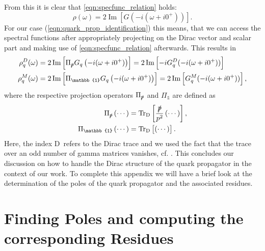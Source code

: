 From this it is clear that \eqref{eqn:specfunc_relation} holds:
\begin{equation}
	\rho(\omega) =  2 \operatorname{Im}\left[G\left(-i(\omega + i0^+)\right)\right].
\end{equation}
For our case (\ref{eqn:quark_prop_identification}) this means, that we can access the spectral functions after appropriately projecting on the Dirac vector and scalar part and making use of \eqref{eqn:specfunc_relation} afterwards.
This results in
\begin{align}
	\rho_q^D(\omega) &= 2 \operatorname{Im}\left[\Pi_{\slashed{p}} G_{q}\left(-i(\omega + i0^+)\right)\right] = 2 \operatorname{Im}\left[-i G_q^D(-i(\omega + i0^+))\right] \\
	\rho_q^M(\omega) &= 2 \operatorname{Im}\left[\Pi_{\mathbb{1}} G_{q}\left(-i(\omega + i0^+)\right)\right]  = 2 \operatorname{Im}\left[G_q^M(-i(\omega + i0^+))\right],
	\label{eqn:correct_relation}
\end{align}
where the respective projection operators $\Pi_{\slashed{p}}$ and $\Pi_{\mathbb{1}}$ are defined as
\begin{align}
	\Pi_{\slashed{p}}\left(\cdots\right) &= \operatorname{Tr}_{\mathrm{D}}\left[\frac{\slashed{p}}{p^2} \left(\cdots\right)\right],\\
	\Pi_{\mathbb{1}}\left(\cdots\right) &= \operatorname{Tr}_{\mathrm{D}}\left[\left(\cdots\right)\right].
\end{align}
Here, the index $\mathrm{D}$\ refers to the Dirac trace and we used the fact that the trace over an odd number of gamma matrices vanishes, cf. \cite{PeskinSchroeder1995}. This concludes our discussion on how to handle the Dirac structure of the quark propagator in the context of our work. To complete this appendix we will have a brief look at the determination of the poles of the quark propagator and the associated residues.
\section*{Finding Poles and computing the corresponding Residues}


